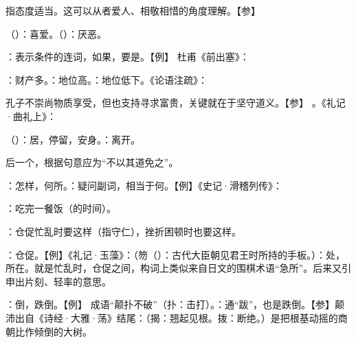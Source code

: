 {
\item {}指态度适当。这可以从者爱人、相敬相惜的角度理解。【参】 
\item {}（）：喜爱。（）：厌恶。
}
{}


{
\item {}：表示条件的连词，如果，要是。【例】 杜甫《前出塞》：
}
{}


{
\item {}：财产多。：地位高。：地位低下。《论语注疏》：

孔子不崇尚物质享受，但也支持寻求富贵，关键就在于坚守道义。【参】  。《礼记·曲礼上》：
\item {}（）：居，停留，安身。：离开。
\item 后一个，根据句意应为“不以其道免之”。
\item {}：怎样，何所。：疑问副词，相当于何。【例】《史记·滑稽列传》：
\item {}：吃完一餐饭（的时间）。
\item {}：仓促忙乱时要这样（指守仁），挫折困顿时也要这样。

：仓促。【例】《礼记·玉藻》：（笏（）：古代大臣朝见君王时所持的手板。）：处，所在。就是忙乱时，仓促之间，构词上类似来自日文的围棋术语“急所”。后来又引申出片刻、轻率的意思。

：倒，跌倒。【例】 成语“颠扑不破”（扑：击打）。：通“跋”，也是跌倒。【参】颠沛出自《诗经·大雅·荡》结尾：（揭：翘起见根。拨：断绝。）是把根基动摇的商朝比作倾倒的大树。
}  %
{}


